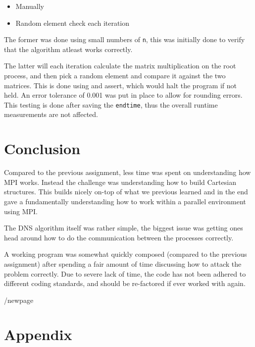 \documentclass[a4paper,11pt,oneside]{book}
\begin{document}
\begin{itemize}
\item Manually
\item Random element check each iteration
\end{itemize}

The former was done using small numbers of \verb!n!, this was initially done to verify that the algorithm atleast works correctly.

The latter will each iteration calculate the matrix multiplication on the root process, and then pick a random element and compare it against the two matrices. This is done using and assert, which would halt the program if not held. An error tolerance of 0.001 was put in place to allow for rounding errors.
This testing is done after saving the \verb!endtime!, thus the overall runtime measurements are not affected.

\chapter{Conclusion}
Compared to the previous assignment, less time was spent on understanding how MPI works. Instead the challenge was understanding how to build Cartesian structures. This builds nicely on-top of what we previous learned and in the end gave a fundamentally understanding how to work within a parallel environment using MPI.

The DNS algorithm itself was rather simple, the biggest issue was getting ones head around how to do the communication between the processes correctly.

A working program was somewhat quickly composed (compared to the previous assignment) after spending a fair amount of time discussing how to attack the problem correctly. Due to severe lack of time, the code has not been adhered to different coding standards, and should be re-factored if ever worked with again.


/newpage
\chapter{Appendix}
\end{document}

